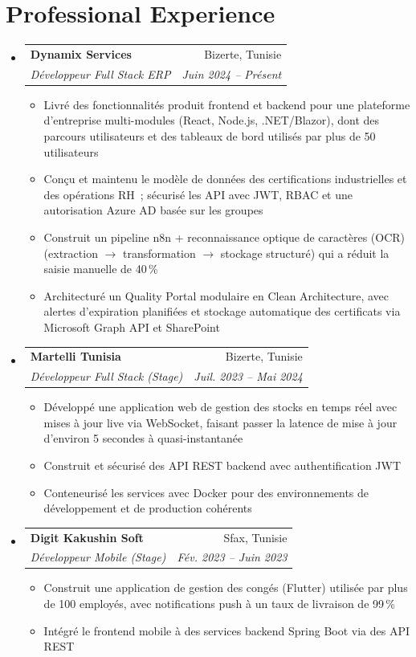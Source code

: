 \documentclass[letterpaper,11pt]{article}
\makeatletter
\newcommand{\resumeItem}[1]{
  \item\small{#1}
}
\newcommand{\resumeSubheading}[4]{
  \vspace{1pt}\item
    \begin{tabular*}{0.97\textwidth}[t]{l@{\extracolsep{\fill}}r}
      \textbf{#1} & #2 \\
      \textit{\small#3} & \textit{\small #4} \\
    \end{tabular*}\vspace{-2pt}
}
\newcommand{\resumeSubHeadingListStart}{\begin{itemize}[leftmargin=0.15in, label={}]}
\newcommand{\resumeSubHeadingListEnd}{\end{itemize}}
\newcommand{\resumeItemListStart}{\begin{itemize}[leftmargin=0.18in,itemsep=1pt]}
\newcommand{\resumeItemListEnd}{\end{itemize}\vspace{1pt}}
\makeatother
\begin{document}
\section{Professional Experience}
  \resumeSubHeadingListStart

    \resumeSubheading
      {Dynamix Services}{Bizerte, Tunisie}
      {Développeur Full Stack ERP}{Juin 2024 -- Présent}
      \resumeItemListStart
        \resumeItem{Livré des fonctionnalités produit frontend et backend pour une plateforme d'entreprise multi-modules (React, Node.js, .NET/Blazor), dont des parcours utilisateurs et des tableaux de bord utilisés par plus de 50 utilisateurs}
        \resumeItem{Conçu et maintenu le modèle de données des certifications industrielles et des opérations RH~; sécurisé les API avec JWT, RBAC et une autorisation Azure AD basée sur les groupes}
        \resumeItem{Construit un pipeline n8n + reconnaissance optique de caractères (OCR) (extraction $\rightarrow$ transformation $\rightarrow$ stockage structuré) qui a réduit la saisie manuelle de 40\,\%}
        \resumeItem{Architecturé un Quality Portal modulaire en Clean Architecture, avec alertes d'expiration planifiées et stockage automatique des certificats via Microsoft Graph API et SharePoint}
      \resumeItemListEnd

    \resumeSubheading
      {Martelli Tunisia}{Bizerte, Tunisie}
      {Développeur Full Stack (Stage)}{Juil. 2023 -- Mai 2024}
      \resumeItemListStart
        \resumeItem{Développé une application web de gestion des stocks en temps réel avec mises à jour live via WebSocket, faisant passer la latence de mise à jour d'environ 5 secondes à quasi-instantanée}
        \resumeItem{Construit et sécurisé des API REST backend avec authentification JWT}
        \resumeItem{Conteneurisé les services avec Docker pour des environnements de développement et de production cohérents}
      \resumeItemListEnd

    \resumeSubheading
      {Digit Kakushin Soft}{Sfax, Tunisie}
      {Développeur Mobile (Stage)}{Fév. 2023 -- Juin 2023}
      \resumeItemListStart
        \resumeItem{Construit une application de gestion des congés (Flutter) utilisée par plus de 100 employés, avec notifications push à un taux de livraison de 99\,\%}
        \resumeItem{Intégré le frontend mobile à des services backend Spring Boot via des API REST}
      \resumeItemListEnd

  \resumeSubHeadingListEnd


\end{document}
